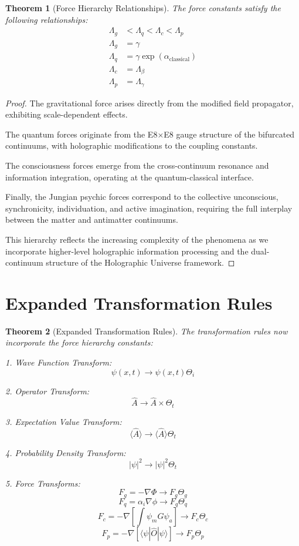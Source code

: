 \documentclass{article}
\theoremstyle{plain}
\newtheorem{theorem}{Theorem}[section]
\theoremstyle{definition}
\theoremstyle{remark}
\begin{document}
\begin{theorem}[Force Hierarchy Relationships]
The force constants satisfy the following relationships:
\begin{align*}
\Lambda_g &< \Lambda_q < \Lambda_c < \Lambda_p \\
\Lambda_g &= \gamma \\
\Lambda_q &= \gamma\exp(\alpha_{\text{classical}}) \\
\Lambda_c &= \Lambda_\beta \\
\Lambda_p &= \Lambda_\gamma
\end{align*}
\end{theorem}

\begin{proof}
The gravitational force arises directly from the modified field propagator, exhibiting scale-dependent effects.

The quantum forces originate from the E8×E8 gauge structure of the bifurcated continuums, with holographic modifications to the coupling constants.

The consciousness forces emerge from the cross-continuum resonance and information integration, operating at the quantum-classical interface.

Finally, the Jungian psychic forces correspond to the collective unconscious, synchronicity, individuation, and active imagination, requiring the full interplay between the matter and antimatter continuums.

This hierarchy reflects the increasing complexity of the phenomena as we incorporate higher-level holographic information processing and the dual-continuum structure of the Holographic Universe framework.
\end{proof}

\section{Expanded Transformation Rules}

\begin{theorem}[Expanded Transformation Rules]
The transformation rules now incorporate the force hierarchy constants:

1. Wave Function Transform:
\[\psi(x,t) \rightarrow \psi(x,t)\Theta_i\]

2. Operator Transform:
\[\hat{A} \rightarrow \hat{A} \times \Theta_t\]

3. Expectation Value Transform:
\[\langle\hat{A}\rangle \rightarrow \langle\hat{A}\rangle\Theta_t\]

4. Probability Density Transform:
\[|\psi|^2 \rightarrow |\psi|^2\Theta_t\]

5. Force Transforms:
\[F_g = -\nabla \Phi \rightarrow F_g\Theta_g\]
\[F_q = \alpha_i\nabla\phi \rightarrow F_q\Theta_q\]
\[F_c = -\nabla\left[\int \psi_m G\psi_a\right] \rightarrow F_c\Theta_c\]
\[F_p = -\nabla\left[\langle\psi|\hat{O}|\psi\rangle\right] \rightarrow F_p\Theta_p\]
\end{theorem}
\end{document}
